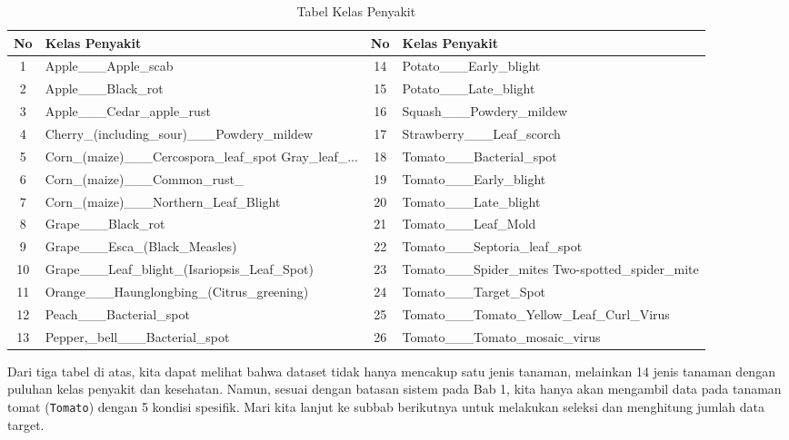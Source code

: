 \begin{table}[H]
\centering
\small
\caption{Tabel Kelas Penyakit}
\begin{tabular}{|c|p{5.5cm}|c|p{5.5cm}|}
\hline
\textbf{No} & \textbf{Kelas Penyakit} & \textbf{No} & \textbf{Kelas Penyakit} \\ \hline
1 & Apple\_\_\_\allowbreak Apple\_scab & 14 & Potato\_\_\_\allowbreak Early\_blight \\ \hline
2 & Apple\_\_\_\allowbreak Black\_rot & 15 & Potato\_\_\_\allowbreak Late\_blight \\ \hline
3 & Apple\_\_\_\allowbreak Cedar\_apple\_rust & 16 & Squash\_\_\_\allowbreak Powdery\_mildew \\ \hline
4 & Cherry\_(including\_sour)\_\_\_\allowbreak Powdery\_mildew & 17 & Strawberry\_\_\_\allowbreak Leaf\_scorch \\ \hline
5 & Corn\_(maize)\_\_\_\allowbreak Cercospora\_leaf\_spot Gray\_leaf\_... & 18 & Tomato\_\_\_\allowbreak Bacterial\_spot \\ \hline
6 & Corn\_(maize)\_\_\_\allowbreak Common\_rust\_ & 19 & Tomato\_\_\_\allowbreak Early\_blight \\ \hline
7 & Corn\_(maize)\_\_\_\allowbreak Northern\_Leaf\_Blight & 20 & Tomato\_\_\_\allowbreak Late\_blight \\ \hline
8 & Grape\_\_\_\allowbreak Black\_rot & 21 & Tomato\_\_\_\allowbreak Leaf\_Mold \\ \hline
9 & Grape\_\_\_\allowbreak Esca\_(Black\_Measles) & 22 & Tomato\_\_\_\allowbreak Septoria\_leaf\_spot \\ \hline
10 & Grape\_\_\_\allowbreak Leaf\_blight\_(Isariopsis\_Leaf\_Spot) & 23 & Tomato\_\_\_\allowbreak Spider\_mites Two-spotted\_spider\_mite \\ \hline
11 & Orange\_\_\_\allowbreak Haunglongbing\_(Citrus\_greening) & 24 & Tomato\_\_\_\allowbreak Target\_Spot \\ \hline
12 & Peach\_\_\_\allowbreak Bacterial\_spot & 25 & Tomato\_\_\_\allowbreak Tomato\_Yellow\_Leaf\_Curl\_Virus \\ \hline
13 & Pepper,\_bell\_\_\_\allowbreak Bacterial\_spot & 26 & Tomato\_\_\_\allowbreak Tomato\_mosaic\_virus \\ \hline
\end{tabular}
\end{table}

Dari tiga tabel di atas, kita dapat melihat bahwa dataset tidak hanya mencakup satu jenis tanaman, melainkan 14 jenis tanaman dengan puluhan kelas penyakit dan kesehatan. Namun, sesuai dengan batasan sistem pada Bab 1, kita hanya akan mengambil data pada tanaman tomat (\texttt{Tomato}) dengan 5 kondisi spesifik. Mari kita lanjut ke subbab berikutnya untuk melakukan seleksi dan menghitung jumlah data target.

